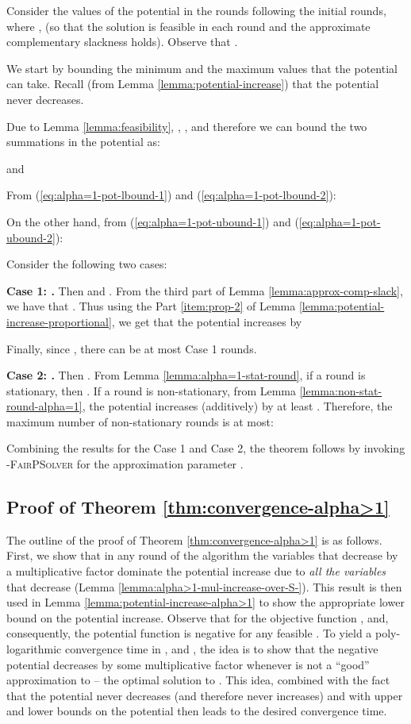 \documentclass[11pt]{article}
\makeatletter
\newenvironment{proofof}[1]{\par
  \pushQED{\qed}\normalfont \topsep3\p@\relax
  \trivlist
  \item[\hskip\labelsep
        \bfseries
    Proof of #1\@addpunct{.}]\ignorespaces
}{\popQED\endtrivlist\@endpefalse
}
\makeatother
\begin{document}
\begin{proofof}{Theorem \ref{thm:convergence-alpha=1}}
Consider the values of the potential in the rounds following the initial  rounds, where ,  (so that the solution  is feasible in each round and the approximate complementary slackness holds). Observe that .

We start by bounding the minimum and the maximum values that the potential can take. Recall (from Lemma \ref{lemma:potential-increase}) that the potential never decreases.

Due to Lemma \ref{lemma:feasibility}, , , and therefore we can bound the two summations in the potential as:



and


From (\ref{eq:alpha=1-pot-lbound-1}) and (\ref{eq:alpha=1-pot-lbound-2}):


On the other hand, from (\ref{eq:alpha=1-pot-ubound-1}) and (\ref{eq:alpha=1-pot-ubound-2}):


Consider the following two cases:

\noindent\textbf{Case 1: .}  Then  and . From the third part of Lemma \ref{lemma:approx-comp-slack}, we have that . Thus using the Part \ref{item:prop-2} of Lemma \ref{lemma:potential-increase-proportional}, we get that the potential increases by 

Finally, since , there can be at most  Case 1 rounds.

\noindent\textbf{Case 2: .}  Then . From Lemma \ref{lemma:alpha=1-stat-round}, if a round is stationary, then . If a round is non-stationary, from Lemma \ref{lemma:non-stat-round-alpha=1}, the potential increases (additively) by at least . Therefore, the maximum number of non-stationary rounds is at most:

Combining the results for the Case 1 and Case 2, the theorem follows by invoking \textsc{-FairPSolver} for the approximation parameter .
\end{proofof}


\subsection{Proof of Theorem \ref{thm:convergence-alpha>1}}\label{section:alpha>1}
The outline of the proof of Theorem \ref{thm:convergence-alpha>1} is as follows. First, we show that in any round of the algorithm the variables that decrease by a multiplicative factor  dominate the potential increase due to \emph{all the variables} that decrease (Lemma \ref{lemma:alpha>1-mul-increase-over-S-}). 
This result is then used in Lemma \ref{lemma:potential-increase-alpha>1} to show the appropriate lower bound on the potential increase. Observe that for  the objective function , and, consequently, the potential function  is negative for any feasible . To yield a poly-logarithmic convergence time in , and , the idea is to show that the negative potential  decreases by some multiplicative factor whenever  is not a ``good'' approximation to  -- the optimal solution to . This idea, combined with the fact that the potential never decreases (and therefore  never increases) and with upper and lower bounds on the potential then leads to the desired convergence time. 
\end{document}

